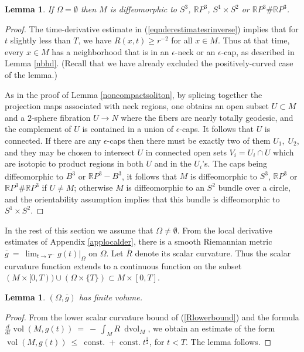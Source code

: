 \documentclass[12pt]{amsart}
\newcommand{\const}{\operatorname{const.}}
\newcommand{\dvol}{\operatorname{dvol}}
\newcommand{\R}{{\mathbb R}}
\newcommand{\vol}{\operatorname{vol}}
\newcommand{\eps}{\epsilon}
\newcommand{\ra}{\rightarrow}
\numberwithin{equation}{section}
\theoremstyle{plain}
\newtheorem{lemma}[equation]{Lemma}
\theoremstyle{definition}
\theoremstyle{remark}
\begin{document}
\begin{lemma} \label{standard}
If $\Omega = \emptyset$ then $M$ is diffeomorphic
to $S^3$, $\R P^3$, $S^1 \times S^2$ or $\R P^3 \# \R P^3$.
\end{lemma}
\begin{proof}
The time-derivative estimate in (\ref{eqnderestimatesrinverse}) implies that 
for $t$ slightly less than $T$, we have
$R(x,t) \ge r^{-2}$ for all
$x \in M$. Thus at that time, every $x \in M$ has a neighborhood that is in an
$\epsilon$-neck or an $\epsilon$-cap, as described in Lemma \ref{nbhd}.
(Recall that we have already excluded the positively-curved case of the lemma.) 

As in the proof of Lemma \ref{noncompactsoliton}, by splicing together the projection
maps associated with neck regions, one obtains an open subset  $U\subset M$ 
and a $2$-sphere
fibration $U\ra N$ where the fibers are nearly totally geodesic, and the complement
of $U$  is contained in a union of $\eps$-caps.   It follows that $U$
is connected. If
 there are any $\epsilon$-caps then there must be exactly two of them $U_1,\;U_2$,
and they may be chosen to intersect $U$ in connected  open sets $V_i=U_i\cap U$
which are isotopic to product regions in both $U$ and in the $U_i$'s. 
 The caps being diffeomorphic to $\overline{B^3}$ or
$\R P^3 - B^3$, it follows that $M$ is diffeomorphic to $S^3$, $\R P^3$ or $\R P^3
\# \R P^3$ if $U\neq M$; otherwise  $M$ is diffeomorphic to an $S^2$ bundle over a circle,
and the orientability assumption implies that this bundle is diffeomorphic
to $S^1\times S^2$.
\end{proof}

In the rest of this section we assume that $\Omega \neq \emptyset$.
From the local derivative estimates of Appendix \ref{applocalder}, there is a smooth
Riemannian metric $\overline{g} \: =\: \lim_{t \rightarrow T^-} g(t) \Big|_\Omega$
on $\Omega$. Let $\overline{R}$ denote its scalar curvature. 
Thus 
the scalar curvature function extends to a continuous function on 
the subset $(M\times [0,T))\cup (\Omega\times\{T\})\subset M\times [0,T]$.

\begin{lemma} \label{volumeomega}
$(\Omega, \overline{g})$ has finite volume.
\end{lemma}
\begin{proof}
From the lower scalar curvature bound of (\ref{Rlowerbound}) and the formula
$\frac{d}{dt} \vol(M, g(t)) \: = \: - \: \int_M R \: \dvol_M$,
we obtain an estimate of the form
$\vol(M, g(t)) \: \le \: \const + \const t^{\frac32}$, for
$t < T$. 
The lemma follows.
\end{proof}
\end{document}
